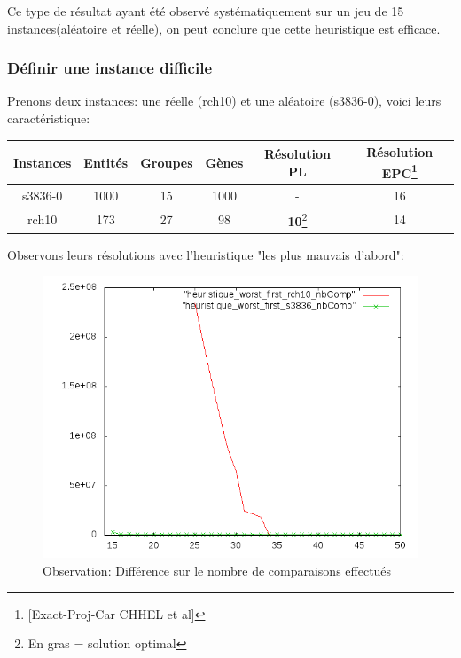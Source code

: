 \documentclass[a4paper,12pt]{article}
\begin{document}
Ce type de résultat ayant été observé systématiquement sur un jeu de 15 instances(aléatoire et réelle), on peut conclure que cette heuristique est efficace.

\subsubsection{Définir une instance difficile}
Prenons deux instances: une réelle (rch10) et une aléatoire (s3836-0), voici leurs caractéristique:
\begin{center}
\begin{tabular}{|c|c|c|c|c|c|}
\hline 
Instances & Entités & Groupes & Gènes & Résolution PL & Résolution EPC\footnote{[Exact-Proj-Car CHHEL et al]} \\ 
\hline 
s3836-0 & 1000 & 15 & 1000 & - & 16 \\ 
\hline
rch10 & 173 & 27 & 98 & \textbf{10}\footnote{En gras = solution optimal} & 14 \\ 
\hline
\end{tabular} 
\end{center}
\vspace{7mm}
Observons leurs résolutions avec l'heuristique "les plus mauvais d'abord":

\begin{figure}[H]
\begin{center}
\includegraphics[scale=0.6]{./graphique/observation_nbComp.png}
\end{center}
\caption{Observation: Différence sur le nombre de comparaisons effectués}
\end{figure}
\end{document}
